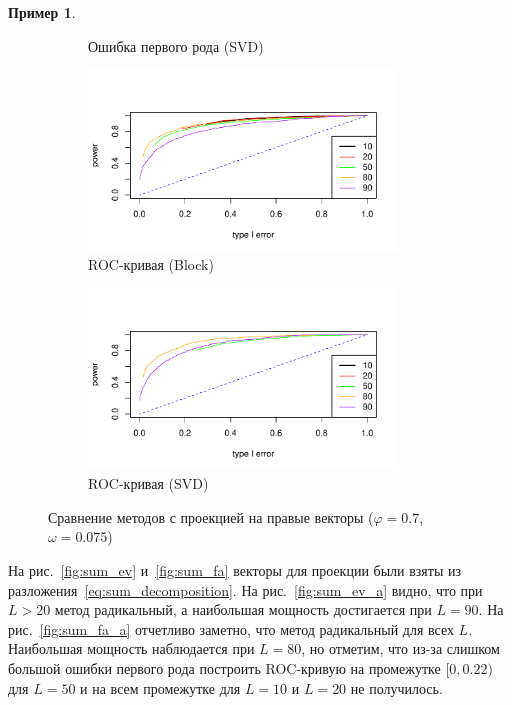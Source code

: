 \documentclass[specialist,
substylefile = spbu_report.rtx,
subf,href,colorlinks=true, 12pt]{disser}
\theoremstyle{definition}
\newtheorem{example}{Пример}
\begin{document}
\begin{example}
\begin{figure}[H]
\begin{subfigure}[t]{0.5\textwidth}
		\caption{Ошибка первого рода (SVD)}
	\end{subfigure}
	\bigskip
	\begin{subfigure}[t]{0.5\textwidth}
		\centering
		\includegraphics[width=0.9\textwidth]{img/roc_block_fa_omega0075.pdf}
		\caption{ROC-кривая (Block)}
		\label{fig:block_fa_r}
	\end{subfigure}\hspace{\fill}
	\begin{subfigure}[t]{0.5\textwidth}
		\centering
		\includegraphics[width=0.9\textwidth]{img/roc_mssa_fa.pdf}
		\caption{ROC-кривая (SVD)}
	\end{subfigure}
	\caption{Сравнение методов с проекцией на правые векторы ($\varphi=0.7$, $\omega=0.075$)}
	\label{fig:block_fa}
\end{figure}

На рис.~\ref{fig:sum_ev} и~\ref{fig:sum_fa} векторы для проекции были взяты из разложения~\eqref{eq:sum_decomposition}. На рис.~\ref{fig:sum_ev_a} видно, что при $L>20$ метод радикальный, а наибольшая мощность достигается при $L=90$. На рис.~\ref{fig:sum_fa_a} отчетливо заметно, что метод радикальный для всех $L$. Наибольшая мощность наблюдается при $L=80$, но отметим, что из-за слишком большой ошибки первого рода построить ROC-кривую на промежутке $[0,0.22)$ для $L=50$ и на всем промежутке для $L=10$ и $L=20$ не получилось.


\end{example}
\end{document}
